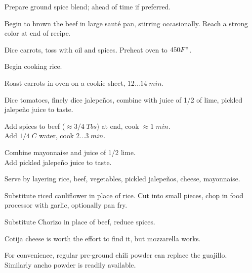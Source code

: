 \begin{preparation}
\item Prepare ground spice blend; ahead of time if preferred.

\item Begin to brown the beef in large saut\'{e} pan, stirring occasionally. Reach a strong color at end of recipe.

\item Dice carrots, toss with oil and spices. Preheat oven to $450 F^\circ$.

\item Begin cooking rice.

\item Roast carrots in oven on a cookie sheet, $12...14\;min$.

\item Dice tomatoes, finely dice jalepe\~{n}os, combine with juice of 1/2 of lime, pickled jalepe\~{n}o juice to taste.

\item Add spices to beef ($\approx 3/4\; Tbs$) at end, cook $\approx1\; min$.\\Add $1/4\;C$ water, cook $2...3\;min$.

\item Combine mayonnaise and juice of 1/2 lime.\\Add pickled jalepe\~{n}o juice to taste.

\item Serve by layering rice, beef, vegetables, pickled jalepe\~{n}os, cheese, mayonnaise.
\end{preparation}


\begin{variation}
\item Substitute riced cauliflower in place of rice. Cut into small pieces, chop in food processor with garlic, optionally pan fry.
\item Substitute Chorizo in place of beef, reduce spices.
\item Cotija cheese is worth the effort to find it, but mozzarella works.
\item For convenience, regular pre-ground chili powder can replace the guajillo. Similarly ancho powder is readily available.
\end{variation}

\recipeend

